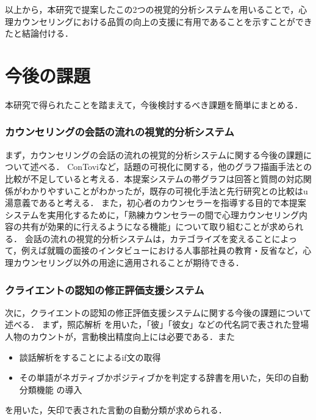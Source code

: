 \documentclass[shuuron]{kuee}
\begin{document}
以上から，本研究で提案したこの2つの視覚的分析システムを用いることで，心理カウンセリングにおける品質の向上の支援に有用であることを示すことができたと結論付ける．%


\section{今後の課題}

本研究で得られたことを踏まえて，今後検討するべき課題を簡単にまとめる．

\subsubsection{カウンセリングの会話の流れの視覚的分析システム}

まず，カウンセリングの会話の流れの視覚的分析システムに関する今後の課題について述べる．
ConTovi\cite{el2016contovi}など，話題の可視化に関する，他のグラフ描画手法との比較が不足していると考える．本提案システムの帯グラフは回答と質問の対応関係がわかりやすいことがわかったが，既存の可視化手法と先行研究との比較はu湯意義であると考える．
また，初心者のカウンセラーを指導する目的で本提案システムを実用化するために，「熟練カウンセラーの間で心理カウンセリング内容の共有が効果的に行えるようになる機能」について取り組むことが求められる．
会話の流れの視覚的分析システムは，カテゴライズを変えることによって，例えば就職の面接のインタビューにおける人事部社員の教育・反省など，心理カウンセリング以外の用途に適用されることが期待できる．%

\subsubsection{クライエントの認知の修正評価支援システム}

次に，クライエントの認知の修正評価支援システムに関する今後の課題について述べる．
まず，照応解析\cite{sasano2009probabilistic} \cite{sasano2011discriminative}を用いた，「彼」「彼女」などの代名詞で表された登場人物のカウントが，言動検出精度向上には必要である．また
\begin{itemize}
  \item 談話解析をすることによるif文の取得\cite{kishimoto}
  \item その単語がネガティブかポジティブかを判定する辞書を用いた，矢印の自動分類機能\cite{小林のぞみ2005意見抽出のための評価表現の収集} \cite{東山昌彦2008述語の選択選好性に着目した名詞評価極性の獲得} の導入
\end{itemize}
を用いた，矢印で表された言動の自動分類が求められる．
\end{document}
